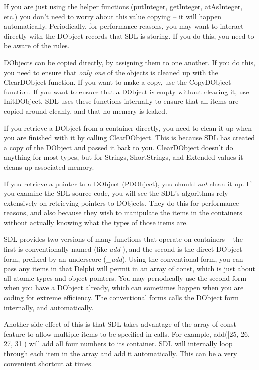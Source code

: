 \documentclass{report}
\begin{document}
If you are just using the helper functions (putInteger, getInteger,
atAsInteger, etc.) you don't need to worry about this value copying -- it
will happen automatically. Periodically, for performance reasons, you may
want to interact directly with the DObject records that SDL
is storing. If you do this, you need to be aware of the rules.

DObjects can be copied directly, by assigning them to one another.  If you
do this, you need to ensure that \emph{only one} of the objects is cleaned
up with the ClearDObject function.  If you want to make a copy, use the
CopyDObject function. If you want to ensure that a DObject is empty without
clearing it, use InitDObject. SDL uses these functions internally to ensure
that all items are copied around cleanly, and that no memory is leaked.

If you retrieve a DObject from a container directly, you need to clean it up
when you are finished with it by calling ClearDObject. This is because SDL
has created a copy of the DObject and passed it back to you. ClearDObject
doesn't do anything for most types, but for Strings, ShortStrings, and
Extended values it cleans up associated memory.

If you retrieve a pointer to a DObject (PDObject), you should \emph{not}
clean it up. If you examine the SDL source code, you will see the SDL's
algorithms rely extensively on retrieving pointers to DObjects. They do this
for performance reasons, and also because they wish to manipulate the items
in the containers without actually knowing what the types of those items
are.

SDL provides two versions of many functions that operate on containers --
the first is conventionally named (like \emph{add} ), and the second is the
direct DObject form, prefixed by an underscore (\emph{\_add}). Using the
conventional form, you can pass any items in that Delphi will permit in an
array of const, which is just about all atomic types and object pointers.
You may periodically use the second form when you have a DObject already,
which can sometimes happen when you are coding for extreme efficiency.  The
conventional forms calls the DObject form internally, and automatically.

Another side effect of this is that SDL takes advantage of the array of
const feature to allow multiple items to be specified in calls. For example,
add([25, 26, 27, 31]) will add all four numbers to its container. SDL will
internally loop through each item in the array and add it automatically.
This can be a very convenient shortcut at times.
\end{document}
